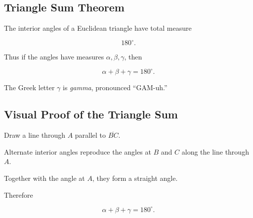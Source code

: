 \subsection{Triangle Sum Theorem}
\label{subsec:triangle-sum-theorem}

\begin{theorem}
The interior angles of a Euclidean triangle have total measure

\[ \boxed{180^\circ.} \]
\end{theorem}

Thus if the angles have measures \(\alpha,\beta,\gamma\), then

\[ \boxed{\alpha+\beta+\gamma=180^\circ.} \]

The Greek letter \(\gamma\) is \emph{gamma}, pronounced ``GAM-uh.''

\subsection{Visual Proof of the Triangle Sum}
\label{subsec:triangle-sum-visual}

\begin{centereddiagram}
\end{centereddiagram}

Draw a line through \(A\) parallel to \(\overline{BC}\).

Alternate interior angles reproduce the angles at \(B\) and \(C\) along the
line through \(A\).

Together with the angle at \(A\), they form a straight angle.

Therefore

\[ \alpha+\beta+\gamma=180^\circ. \]


